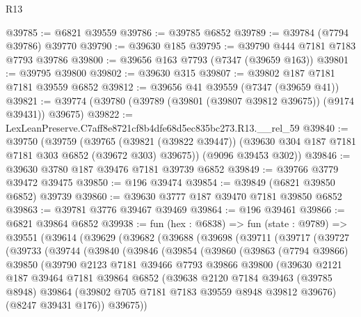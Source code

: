 \begin{lexlean}{R13}
\begin{coremodule}
@39785 := @6821 @39559
@39786 := @39785 @6852
@39789 := @39784 (@7794 @39786) @39770
@39790 := @39630 @185
@39795 := @39790 @444 @7181 @7183 @7793 @39786
@39800 := @39656 @163 @7793 (@7347 (@39659 @163))
@39801 := @39795 @39800
@39802 := @39630 @315
@39807 := @39802 @187 @7181 @7181 @39559 @6852
@39812 := @39656 @41 @39559 (@7347 (@39659 @41))
@39821 := @39774 (@39780 (@39789 (@39801 (@39807 @39812 @39675)) (@9174 @39431)) @39675)
@39822 := LexLeanPreserve.C7aff8e8721cf8b4dfe68d5ec835bc273.R13.__rel_59
@39840 := @39750
    (@39759
      (@39765
        (@39821 (@39822 @39447))
        (@39630 @304 @187 @7181 @7181 @303 @6852 (@39672 @303) @39675))
      (@9096 @39453 @302))
@39846 := @39630 @3780 @187 @39476 @7181 @39739 @6852
@39849 := @39766 @3779 @39472 @39475
@39850 := @196 @39474
@39854 := @39849 (@6821 @39850 @6852) @39739
@39860 := @39630 @3777 @187 @39470 @7181 @39850 @6852
@39863 := @39781 @3776 @39467 @39469
@39864 := @196 @39461
@39866 := @6821 @39864 @6852
@39938 := fun (hex : @6838) =>
  fun (state : @9789) =>
  @39551
    (@39614
      (@39629
        (@39682
          (@39688
            (@39698
              (@39711
                (@39717
                  (@39727
                    (@39733
                      (@39744
                        (@39840
                          (@39846
                            (@39854
                              (@39860
                                (@39863
                                  (@7794 @39866)
                                  @39850
                                  (@39790
                                    @2123
                                    @7181
                                    @39466
                                    @7793
                                    @39866
                                    @39800
                                    (@39630
                                      @2121
                                      @187
                                      @39464
                                      @7181
                                      @39864
                                      @6852
                                      (@39638
                                        @2120
                                        @7184
                                        @39463
                                        (@39785 @8948)
                                        @39864
                                        (@39802 @705 @7181 @7183 @39559 @8948 @39812 @39676)
                                        (@8247 @39431 @176))
                                      @39675))

\end{coremodule}
\end{lexlean}
